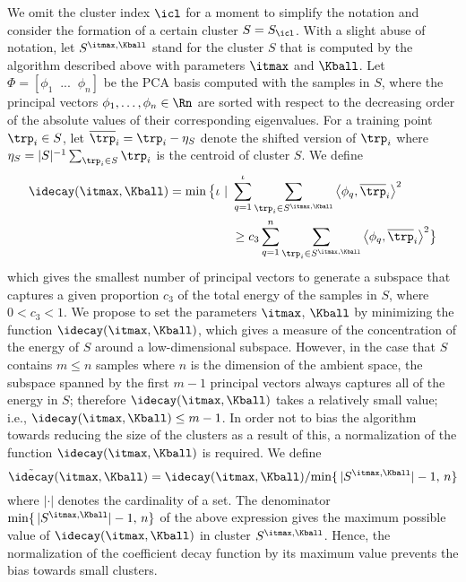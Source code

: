\documentclass[journal]{IEEEtran}
\begin{document}
We omit the cluster index $\icl$ for a moment to simplify the notation and consider the formation of a certain cluster $S=S_\icl$. With a slight abuse of notation, let  $S^{\itmax,\Kball} $ stand for the cluster $S$ that is computed by the algorithm described above with parameters $\itmax$ and $\Kball$. Let $\Phi=\left[\phi_1\;\;...\;\;\phi_n\right]$ be the PCA basis computed with the samples in $S$, where  the principal vectors $\phi_1, \dots, \phi_n \in \Rn$ are sorted with respect to the decreasing order of the absolute values of their corresponding eigenvalues. For a training point $\trp_i \in S$, let $\overline \trp_i = \trp_i - \eta_S $ denote the shifted version of $\trp_i$ where $\eta_S=|S|^{-1} \sum_{\trp_i \in S} \trp_i$ is the centroid of cluster $S$. We define
\begin{equation}
	\label{eqn:funclb}
	\begin{split}	
	\idecay(\itmax, \Kball)
	 =\min \big \{  \iota\ |\
	 &\sum_{q=1}^{\iota}
	 {\sum_{\trp_i \in S^{\itmax,\Kball}  }{\left\langle \phi_q,  \overline \trp_i \right\rangle^2}} \\
	 &\geq
	  c_3\sum_{q=1}^{n}
	  {\sum_{\trp_i \in S^{\itmax,\Kball} } {\left\langle \phi_q , \overline \trp_i \right\rangle^2}} 
	  \big \}
	  \end{split}
\end{equation}
which gives the smallest number of principal vectors to generate a subspace that captures a given proportion $c_3$ of the total energy of the samples in $S$, where $0<c_3<1$. We propose to set the parameters $\itmax$, $\Kball $ by minimizing the function $\idecay(\itmax, \Kball)$, which gives a measure of the concentration of the energy of $S$ around a low-dimensional subspace. However, in the case that $S$ contains $m \leq n$ samples where $n$ is the dimension of the ambient space, the subspace spanned by the first $m-1$ principal vectors always captures all of the energy in $S$; therefore $\idecay(\itmax, \Kball)$ takes a relatively small value; i.e., $\idecay(\itmax, \Kball) \leq m-1$.  In order not to bias the algorithm towards reducing the size of the clusters as a result of this, a normalization of the function $\idecay(\itmax, \Kball)$ is required. We define 
\begin{equation} 
\label{eq:defn_decayfun_goc}
\tilde \idecay(\itmax, \Kball) =   \idecay(\itmax, \Kball)  / 
{\min \{ \, |S^{\itmax,\Kball}| -1, \, n \}}
\end{equation} 
where $| \cdot |$ denotes the cardinality of a set. The denominator $\min \{ \, |S^{\itmax,\Kball}| -1, \, n \}$ of the above expression gives the maximum possible value of $\idecay(\itmax, \Kball)$ in cluster $S^{\itmax,\Kball}$. Hence, the normalization of the coefficient decay function by its maximum value prevents the bias towards small clusters. 
\end{document}
